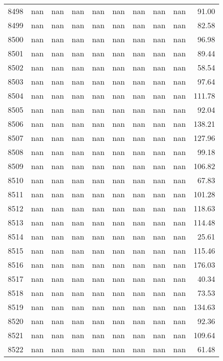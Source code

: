 \begin{tabular}{lrrrrrrrrr}
8498 & nan & nan & nan & nan & nan & nan & nan & nan & 91.00 \\
8499 & nan & nan & nan & nan & nan & nan & nan & nan & 82.58 \\
8500 & nan & nan & nan & nan & nan & nan & nan & nan & 96.98 \\
8501 & nan & nan & nan & nan & nan & nan & nan & nan & 89.44 \\
8502 & nan & nan & nan & nan & nan & nan & nan & nan & 58.54 \\
8503 & nan & nan & nan & nan & nan & nan & nan & nan & 97.64 \\
8504 & nan & nan & nan & nan & nan & nan & nan & nan & 111.78 \\
8505 & nan & nan & nan & nan & nan & nan & nan & nan & 92.04 \\
8506 & nan & nan & nan & nan & nan & nan & nan & nan & 138.21 \\
8507 & nan & nan & nan & nan & nan & nan & nan & nan & 127.96 \\
8508 & nan & nan & nan & nan & nan & nan & nan & nan & 99.18 \\
8509 & nan & nan & nan & nan & nan & nan & nan & nan & 106.82 \\
8510 & nan & nan & nan & nan & nan & nan & nan & nan & 67.83 \\
8511 & nan & nan & nan & nan & nan & nan & nan & nan & 101.28 \\
8512 & nan & nan & nan & nan & nan & nan & nan & nan & 118.63 \\
8513 & nan & nan & nan & nan & nan & nan & nan & nan & 114.48 \\
8514 & nan & nan & nan & nan & nan & nan & nan & nan & 25.61 \\
8515 & nan & nan & nan & nan & nan & nan & nan & nan & 115.46 \\
8516 & nan & nan & nan & nan & nan & nan & nan & nan & 176.03 \\
8517 & nan & nan & nan & nan & nan & nan & nan & nan & 40.34 \\
8518 & nan & nan & nan & nan & nan & nan & nan & nan & 73.53 \\
8519 & nan & nan & nan & nan & nan & nan & nan & nan & 134.63 \\
8520 & nan & nan & nan & nan & nan & nan & nan & nan & 92.36 \\
8521 & nan & nan & nan & nan & nan & nan & nan & nan & 109.64 \\
8522 & nan & nan & nan & nan & nan & nan & nan & nan & 61.48 \\

\end{tabular}
